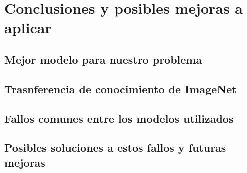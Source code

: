 \section{Conclusiones y posibles mejoras a aplicar}

\subsection{Mejor modelo para nuestro problema}


\subsection{Trasnferencia de conocimiento de ImageNet}


\subsection{Fallos comunes entre los modelos utilizados}

\subsection{Posibles soluciones a estos fallos y futuras mejoras}
